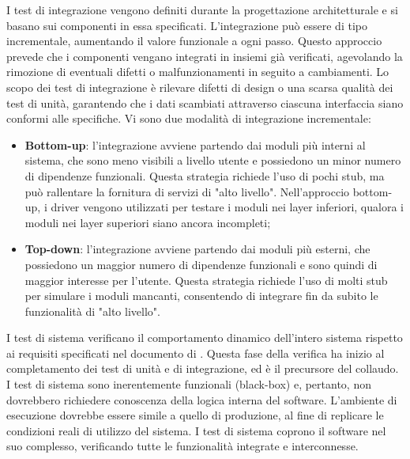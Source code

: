 \par I test di integrazione vengono definiti durante la progettazione architetturale e si basano sui componenti in essa specificati. L’integrazione può essere di tipo incrementale, aumentando il valore funzionale a ogni passo. Questo approccio prevede che i componenti vengano integrati in insiemi già verificati, agevolando la rimozione di eventuali difetti o malfunzionamenti in seguito a cambiamenti. Lo scopo dei test di integrazione è rilevare difetti di design o una scarsa qualità dei test di unità, garantendo che i dati scambiati attraverso ciascuna interfaccia siano conformi alle specifiche. Vi sono due modalità di integrazione incrementale:
\begin{itemize}
  \item \textbf{Bottom-up}: l’integrazione avviene partendo dai moduli più interni al sistema, che sono meno visibili a livello utente e possiedono un minor numero di dipendenze funzionali. Questa strategia richiede l’uso di pochi stub, ma può rallentare la fornitura di servizi di "alto livello". Nell’approccio bottom-up, i driver vengono utilizzati per testare i moduli nei layer inferiori, qualora i moduli nei layer superiori siano ancora incompleti;
  \item \textbf{Top-down}: l’integrazione avviene partendo dai moduli più esterni, che possiedono un maggior numero di dipendenze funzionali e sono quindi di maggior interesse per l’utente. Questa strategia richiede l'uso di molti stub per simulare i moduli mancanti, consentendo di integrare fin da subito le funzionalità di "alto livello".
\end{itemize}

\par I test di sistema verificano il comportamento dinamico dell'intero sistema rispetto ai requisiti specificati nel documento di \AnalisiDeiRequisiti. Questa fase della verifica ha inizio al completamento dei test di unità e di integrazione, ed è il precursore del collaudo. I test di sistema sono inerentemente funzionali (black-box) e, pertanto, non dovrebbero richiedere conoscenza della logica interna del software. L’ambiente di esecuzione dovrebbe essere simile a quello di produzione, al fine di replicare le condizioni reali di utilizzo del sistema. I test di sistema coprono il software nel suo complesso, verificando tutte le funzionalità integrate e interconnesse.

